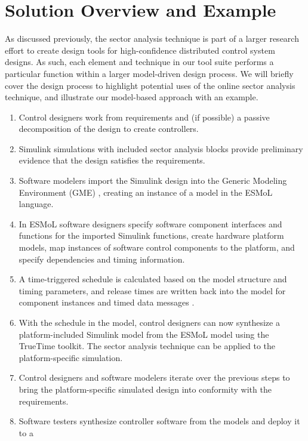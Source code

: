\section{Solution Overview and Example}
\label{section:solution}

As discussed previously, the sector analysis technique is part of a larger research effort to 
create design tools for high-confidence distributed control system designs.  As such, each element
and technique in our tool suite performs a particular function within a larger model-driven design 
process.  We will briefly cover the design process to highlight potential uses of the online sector
analysis technique, and illustrate our model-based approach with an example.

\begin{enumerate}
 \item Control designers work from requirements and (if possible) a passive decomposition of the
design to create controllers.
 \item Simulink simulations with included sector analysis blocks provide preliminary evidence that
the design satisfies the requirements.
 \item Software modelers import the Simulink design into the Generic Modeling Environment (GME)
\cite{mic:overview}, creating an instance of a model in the ESMoL language.
 \item In ESMoL software designers specify software component interfaces and functions for the
imported Simulink functions, create hardware platform models, map instances of software control 
components to the platform, and specify dependencies and timing information.
 \item A time-triggered schedule is calculated based on the model structure and timing parameters,
and release times are written back into the model for component instances and timed data messages
\cite{sched:analysis}.
 \item With the schedule in the model, control designers can now synthesize a platform-included Simulink model from the ESMoL model
using the TrueTime toolkit\cite{modeling:truetime}.  The sector analysis technique can be applied
to the platform-specific simulation.
 \item Control designers and software modelers iterate over the previous steps to bring the 
platform-specific simulated design into conformity with the requirements.
 \item Software testers synthesize controller software from the models and deploy it to a 

\end{enumerate}
